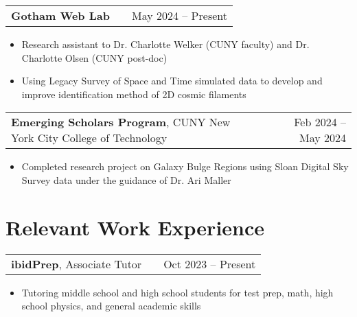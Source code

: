 \documentclass[a4paper,12pt]{article}
\makeatletter
\newenvironment{joblong}[2]
    {
    \begin{tabularx}{\linewidth}{@{}l X r@{}}
    #1 & \hfill &  #2 \\[3.75pt]
    \end{tabularx}
    \begin{minipage}[t]{\linewidth}
    \begin{itemize}[nosep,after=\strut, leftmargin=1em, itemsep=3pt,label=--]
    }
    {
    \end{itemize}
    \end{minipage}    
    }
\makeatother
\begin{document}
\begin{joblong}{\textbf{Gotham Web Lab}}{May 2024 -- Present}
\item Research assistant to Dr. Charlotte Welker (CUNY faculty) and Dr. Charlotte Olsen (CUNY post-doc)
\item Using Legacy Survey of Space and Time simulated data to develop and improve identification method of 2D cosmic filaments 
\end{joblong}

\begin{joblong}{\textbf{Emerging Scholars Program}, CUNY New York City College of Technology}{Feb 2024 -- May 2024}
\item Completed research project on Galaxy Bulge Regions using Sloan Digital Sky Survey data under the guidance of Dr. Ari Maller 
\end{joblong}
  
\section{Relevant Work Experience}

\begin{joblong}{\textbf{ibidPrep}, Associate Tutor}{Oct 2023 -- Present}
\item Tutoring middle school and high school students for test prep, math, high school physics, and general academic skills
\end{joblong}
\end{document}
